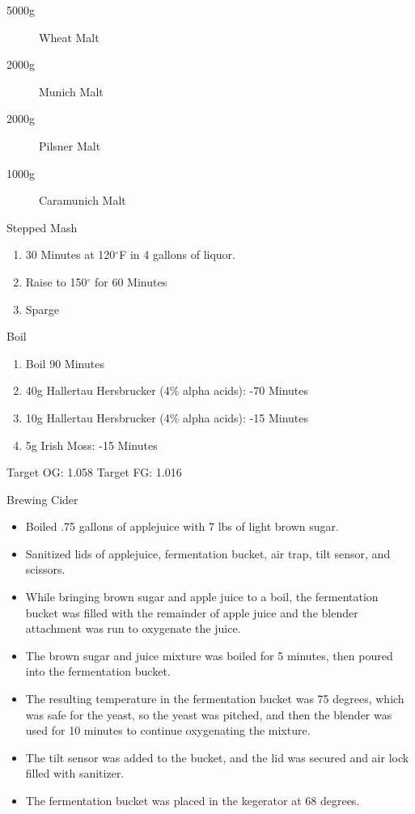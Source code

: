 \begin{description}
    \item[5000g] Wheat Malt
    \item[2000g] Munich Malt
    \item[2000g] Pilsner Malt
    \item[1000g] Caramunich Malt
\end{description}

Stepped Mash
\begin{enumerate}
  \item 30 Minutes at 120$^{\circ}$F in 4 gallons of liquor.
  \item Raise to 150$^{\circ}$ for 60 Minutes
  \item Sparge
\end{enumerate}

Boil
\begin{enumerate}
    \item Boil 90 Minutes
    \item 40g Hallertau Hersbrucker (4\% alpha acids): -70 Minutes
    \item 10g Hallertau Hersbrucker (4\% alpha acids): -15 Minutes
    \item 5g Irish Moss: -15 Minutes
\end{enumerate}

Target OG: 1.058
Target FG: 1.016

\def\todaysdate{20190707}
\newday{\todaysdate}\label{\todaysdate}

Brewing Cider

\begin{itemize}
    \item Boiled .75 gallons of applejuice with 7 lbs of light brown sugar.
    \item Sanitized lids of applejuice, fermentation bucket, air trap, tilt sensor, and scissors.
    \item While bringing brown sugar and apple juice to a boil, the fermentation bucket was filled with the remainder of apple juice and the blender attachment was run to oxygenate the juice.
    \item The brown sugar and juice mixture was boiled for 5 minutes, then poured into the fermentation bucket.
    \item The resulting temperature in the fermentation bucket was 75 degrees, which was safe for the yeast, so the yeast was pitched, and then the blender was used for 10 minutes to continue oxygenating the mixture.
    \item The tilt sensor was added to the bucket, and the lid was secured and air lock filled with sanitizer.
    \item The fermentation bucket was placed in the kegerator at 68 degrees.
\end{itemize}

